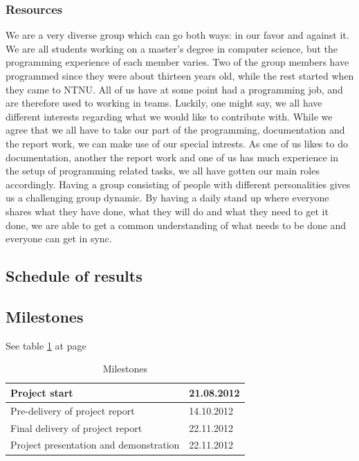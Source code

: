 \subsubsection{Resources}
We are a very diverse group which can go both ways: in our favor and against it. We are all students working on a master's degree in computer science, but the programming experience of each member varies. Two of the group members have
programmed since they were about thirteen years old, while the rest started when they came to NTNU. All of us have at some point had a programming job, and are therefore used to working in teams.
\newline
\newline
Luckily, one might say, we all have different interests regarding what we would like to contribute with. While we agree that we all have to take our part of the programming, documentation and the report work, we can make use of our special intrests. As one of us likes to do documentation, another the report work and one of us has much experience in the setup of programming related tasks, we all have gotten our main roles accordingly.
\newline
\newline
Having a group consisting of people with different personalities gives us a challenging group dynamic. By having a daily stand up where everyone shares what they have done, what they will do and what they need to get it done, we are able to get a common understanding of what needs to be done and everyone can get in sync. 

\subsection{Schedule of results}

\subsection*{Milestones}
See table \ref{tab:milestones} at page \pageref{tab:milestones}
\begin{table}
\begin{tabular}{l|l}
Project start &  21.08.2012\\ \hline
Pre-delivery of project report & 14.10.2012\\ \hline
Final delivery of project report & 22.11.2012\\ \hline
Project presentation and demonstration & 22.11.2012
\end{tabular}
\caption{Milestones} \label{tab:milestones}
\end{table}

